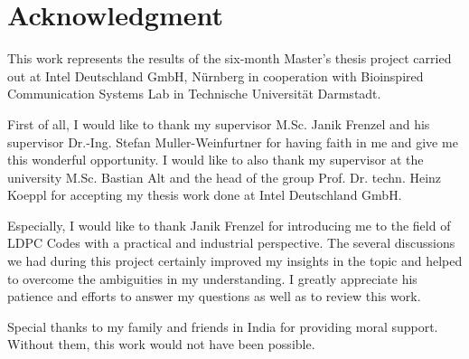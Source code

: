 \chapter*{Acknowledgment}
This work represents the results of the six-month Master’s thesis project carried out at Intel Deutschland GmbH, Nürnberg in cooperation with Bioinspired Communication Systems Lab in Technische Universität Darmstadt.

First of all, I would like to thank my supervisor M.Sc. Janik Frenzel and his supervisor Dr.-Ing. Stefan Muller-Weinfurtner for having faith in me and give me this wonderful opportunity. I would like to also thank my supervisor at the university M.Sc. Bastian Alt and the head of the group Prof. Dr. techn. Heinz Koeppl for accepting my thesis work done at Intel Deutschland GmbH.

Especially, I would like to thank Janik Frenzel for introducing me to the field of LDPC Codes with a practical and industrial perspective. The several discussions we had during this project certainly improved my insights in the topic and helped to overcome the ambiguities in my understanding. I greatly appreciate his patience and efforts to answer my questions as well as to review this work.

Special thanks to my family and friends in India for providing moral support. Without them, this work would not have been possible.




